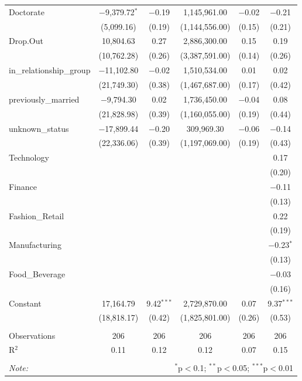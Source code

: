\begin{table}[!htbp]
\begin{tabular}{@{\extracolsep{1pt}}lccccc}
  Doctorate & $-$9,379.72$^{*}$ & $-$0.19 & 1,145,961.00 & $-$0.02 & $-$0.21 \\ 
  & (5,099.16) & (0.19) & (1,144,556.00) & (0.15) & (0.21) \\ 
  Drop.Out & 10,804.63 & 0.27 & 2,886,300.00 & 0.15 & 0.19 \\ 
  & (10,762.28) & (0.26) & (3,387,591.00) & (0.14) & (0.26) \\ 
  in\_relationship\_group & $-$11,102.80 & $-$0.02 & 1,510,534.00 & 0.01 & 0.02 \\ 
  & (21,749.30) & (0.38) & (1,467,687.00) & (0.17) & (0.42) \\ 
  previously\_married & $-$9,794.30 & 0.02 & 1,736,450.00 & $-$0.04 & 0.08 \\ 
  & (21,828.98) & (0.39) & (1,160,055.00) & (0.19) & (0.44) \\ 
  unknown\_status & $-$17,899.44 & $-$0.20 & 309,969.30 & $-$0.06 & $-$0.14 \\ 
  & (22,336.06) & (0.39) & (1,197,069.00) & (0.19) & (0.43) \\ 
  Technology &  &  &  &  & 0.17 \\ 
  &  &  &  &  & (0.20) \\ 
  Finance &  &  &  &  & $-$0.11 \\ 
  &  &  &  &  & (0.13) \\ 
  Fashion\_Retail &  &  &  &  & 0.22 \\ 
  &  &  &  &  & (0.19) \\ 
  Manufacturing &  &  &  &  & $-$0.23$^{*}$ \\ 
  &  &  &  &  & (0.13) \\ 
  Food\_Beverage &  &  &  &  & $-$0.03 \\ 
  &  &  &  &  & (0.16) \\ 
  Constant & 17,164.79 & 9.42$^{***}$ & 2,729,870.00 & 0.07 & 9.37$^{***}$ \\ 
  & (18,818.17) & (0.42) & (1,825,801.00) & (0.26) & (0.53) \\ 
 \hline \\[-1.8ex] 
Observations & 206 & 206 & 206 & 206 & 206 \\ 
R$^{2}$ & 0.11 & 0.12 & 0.12 & 0.07 & 0.15 \\ 
\hline 
\hline \\[-1.8ex] 
\textit{Note:}  & \multicolumn{5}{r}{$^{*}$p$<$0.1; $^{**}$p$<$0.05; $^{***}$p$<$0.01} \\ 
\end{tabular} 
\end{table} 
